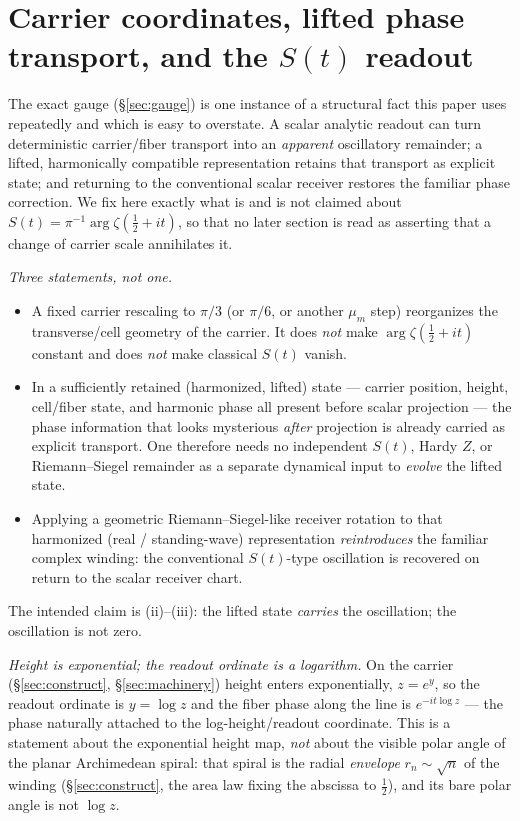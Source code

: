 \documentclass[11pt]{article}
\theoremstyle{definition}
\begin{document}
\section{Carrier coordinates, lifted phase transport, and the \texorpdfstring{$S(t)$}{S(t)} readout}\label{sec:st}

The exact gauge (\S\ref{sec:gauge}) is one instance of a structural fact this paper uses repeatedly and which
is easy to overstate. A scalar analytic readout can turn deterministic carrier/fiber transport into an
\emph{apparent} oscillatory remainder; a lifted, harmonically compatible representation retains that transport
as explicit state; and returning to the conventional scalar receiver restores the familiar phase correction.
We fix here exactly what is and is not claimed about $S(t)=\pi^{-1}\arg\zeta(\tfrac12+it)$, so that no later
section is read as asserting that a change of carrier scale annihilates it.

\emph{Three statements, not one.}
\begin{itemize}
\item[(i)] A fixed carrier rescaling to $\pi/3$ (or $\pi/6$, or another $\mu_m$ step) reorganizes the
transverse/cell geometry of the carrier. It does \emph{not} make $\arg\zeta(\tfrac12+it)$ constant and does
\emph{not} make classical $S(t)$ vanish.
\item[(ii)] In a sufficiently retained (harmonized, lifted) state --- carrier position, height, cell/fiber
state, and harmonic phase all present before scalar projection --- the phase information that looks mysterious
\emph{after} projection is already carried as explicit transport. One therefore needs no independent $S(t)$,
Hardy $Z$, or Riemann--Siegel remainder as a separate dynamical input to \emph{evolve} the lifted state.
\item[(iii)] Applying a geometric Riemann--Siegel-like receiver rotation to that harmonized (real /
standing-wave) representation \emph{reintroduces} the familiar complex winding: the conventional $S(t)$-type
oscillation is recovered on return to the scalar receiver chart.
\end{itemize}
The intended claim is (ii)--(iii): the lifted state \emph{carries} the oscillation; the oscillation is not
zero.

\emph{Height is exponential; the readout ordinate is a logarithm.} On the carrier (\S\ref{sec:construct},
\S\ref{sec:machinery}) height enters exponentially, $z=e^{y}$, so the readout ordinate is $y=\log z$ and the
fiber phase along the line is $e^{-it\log z}$ --- the phase naturally attached to the log-height/readout
coordinate. This is a statement about the exponential height map, \emph{not} about the visible polar angle of
the planar Archimedean spiral: that spiral is the radial \emph{envelope} $r_n\sim\sqrt n$ of the winding
(\S\ref{sec:construct}, the area law fixing the abscissa to $\tfrac12$), and its bare polar angle is not
$\log z$.
\end{document}
